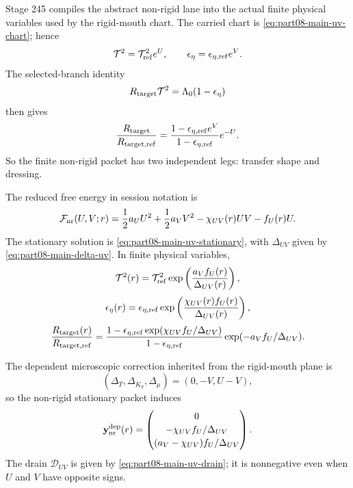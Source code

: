 Stage 245 compiles the abstract non-rigid lane into the actual finite physical variables used by the rigid-mouth chart.  The carried chart is \cref{eq:part08-main-uv-chart}; hence
\begin{equation}
\label{eq:part08-stage245-direct-observables}
\mathcal T^2=\mathcal T_{\rm ref}^{2}e^U,
\qquad
\epsilon_\eta=\epsilon_{\eta,{\rm ref}}e^V.
\end{equation}
The selected-branch identity
\begin{equation}
\label{eq:part08-stage245-selected-identity}
R_{\rm target}\mathcal T^2=\Lambda_0(1-\epsilon_\eta)
\end{equation}
then gives
\begin{equation}
\label{eq:part08-stage245-rtarget-finite}
\frac{R_{\rm target}}{R_{\rm target,ref}}
=
\frac{1-\epsilon_{\eta,{\rm ref}}e^V}{1-\epsilon_{\eta,{\rm ref}}}e^{-U}.
\end{equation}
So the finite non-rigid packet has two independent legs: transfer shape and dressing.

The reduced free energy in session notation is
\begin{equation}
\label{eq:part08-stage245-fnr}
\mathcal F_{\rm nr}(U,V;r)
=
\frac12a_UU^2+\frac12a_VV^2-\chi_{UV}(r)UV-f_U(r)U.
\end{equation}
The stationary solution is \cref{eq:part08-main-uv-stationary}, with \(\Delta_{UV}\) given by \cref{eq:part08-main-delta-uv}.  In finite physical variables,
\begin{equation}
\label{eq:part08-stage245-finite-t}
\mathcal T^2(r)
=
\mathcal T_{\rm ref}^2\exp\left(\frac{a_Vf_U(r)}{\Delta_{UV}(r)}\right),
\end{equation}
\begin{equation}
\label{eq:part08-stage245-finite-epseta}
\epsilon_\eta(r)
=
\epsilon_{\eta,{\rm ref}}\exp\left(\frac{\chi_{UV}(r)f_U(r)}{\Delta_{UV}(r)}\right),
\end{equation}
\begin{equation}
\label{eq:part08-stage245-finite-rtarget}
\frac{R_{\rm target}(r)}{R_{\rm target,ref}}
=
\frac{1-\epsilon_{\eta,{\rm ref}}\exp(\chi_{UV}f_U/\Delta_{UV})}{1-\epsilon_{\eta,{\rm ref}}}
\exp(-a_Vf_U/\Delta_{UV}).
\end{equation}

The dependent microscopic correction inherited from the rigid-mouth plane is
\begin{equation}
\label{eq:part08-stage245-dependent-plane}
(\Delta_T,\Delta_{K_\eta},\Delta_\mu)
=(0,-V,U-V),
\end{equation}
so the non-rigid stationary packet induces
\begin{equation}
\label{eq:part08-stage245-dependent-nr}
\mathbf y_{\rm nr}^{\rm dep}(r)
=
\begin{pmatrix}
0\\[2pt]
-\chi_{UV}f_U/\Delta_{UV}\\[2pt]
(a_V-\chi_{UV})f_U/\Delta_{UV}
\end{pmatrix}.
\end{equation}
The drain \(\mathcal D_{UV}\) is given by \cref{eq:part08-main-uv-drain}; it is nonnegative even when \(U\) and \(V\) have opposite signs.

